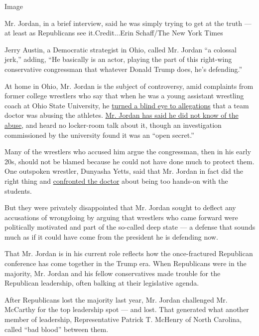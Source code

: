 Image

Mr. Jordan, in a brief interview, said he was simply trying to get at
the truth --- at least as Republicans see it.Credit...Erin Schaff/The
New York Times

Jerry Austin, a Democratic strategist in Ohio, called Mr. Jordan ``a
colossal jerk,'' adding, ``He basically is an actor, playing the part of
this right-wing conservative congressman that whatever Donald Trump
does, he's defending.''

At home in Ohio, Mr. Jordan is the subject of controversy, amid
complaints from former college wrestlers who say that when he was a
young assistant wrestling coach at Ohio State University, he
\href{https://www.nytimes3xbfgragh.onion/2018/07/06/us/politics/jim-jordan-sexual-misconduct.html?module=inline}{turned
a blind eye to allegations} that a team doctor was abusing the athletes.
\href{https://www.nytimes3xbfgragh.onion/2019/05/17/us/politics/jim-jordan-sexual-abuse-ohio-state.html}{Mr.
Jordan has said he did not know of the abuse}, and heard no locker-room
talk about it, though an investigation commissioned by the university
found it was an ``open secret.''

Many of the wrestlers who accused him argue the congressman, then in his
early 20s, should not be blamed because he could not have done much to
protect them. One outspoken wrestler, Dunyasha Yetts, said that Mr.
Jordan in fact did the right thing and
\href{https://www.nytimes3xbfgragh.onion/2019/05/17/us/politics/jim-jordan-sexual-abuse-ohio-state.html}{confronted
the doctor} about being too hands-on with the students.

But they were privately disappointed that Mr. Jordan sought to deflect
any accusations of wrongdoing by arguing that wrestlers who came forward
were politically motivated and part of the so-called deep state --- a
defense that sounds much as if it could have come from the president he
is defending now.

That Mr. Jordan is in his current role reflects how the once-fractured
Republican conference has come together in the Trump era. When
Republicans were in the majority, Mr. Jordan and his fellow
conservatives made trouble for the Republican leadership, often balking
at their legislative agenda.

After Republicans lost the majority last year, Mr. Jordan challenged Mr.
McCarthy for the top leadership spot --- and lost. That generated what
another member of leadership, Representative Patrick T. McHenry of North
Carolina, called ``bad blood'' between them.

